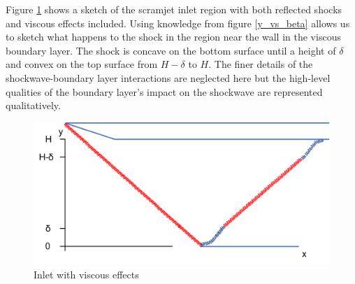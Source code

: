 \documentclass[../main.tex]{subfiles}
\begin{document}
Figure \ref{viscous_inlet} shows a sketch of the scramjet inlet region with both reflected shocks and viscous effects included.
Using knowledge from figure \ref{y_vs_beta} allows us to sketch what happens to the shock in the region near the wall in the viscous boundary layer.
The shock is concave on the bottom surface until a height of \(\delta\) and convex on the top surface from \(H-\delta\) to \(H\).
The finer details of the shockwave-boundary layer interactions are neglected here but the high-level qualities of the boundary layer's impact on the shockwave are represented qualitatively.

 
\begin{figure}[h!]
    \centering
    \includegraphics[scale=0.7]{../../images/problem_3/shock_inlet.png}
    \caption{Inlet with viscous effects}
    \label{viscous_inlet}
\end{figure}
\end{document}
